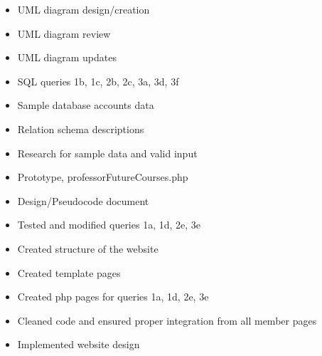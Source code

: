 \begin{itemize}
	\item UML diagram design/creation
	\item UML diagram review
	\item UML diagram updates
	\item SQL queries 1b, 1c, 2b, 2c, 3a, 3d, 3f
	\item Sample database accounts data
	\item Relation schema descriptions
	\item Research for sample data and valid input
	\item Prototype, professorFutureCourses.php
	\item Design/Pseudocode document
	\item Tested and modified queries 1a, 1d, 2e, 3e
	\item Created structure of the website
	\item Created template pages
	\item Created php pages for queries 1a, 1d, 2e, 3e
	\item Cleaned code and ensured proper integration from all member pages
	\item Implemented website design

\end{itemize}